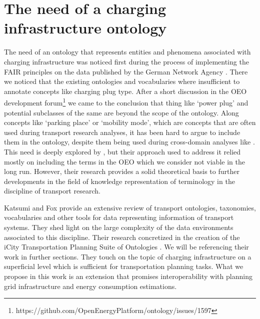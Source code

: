 ﻿\section{The need of a charging infrastructure ontology}
\label{statementofneed}
The need of an ontology that represents entities and phenomena associated with
charging infrastructure was noticed first during the process of implementing
the FAIR principles on the data published by the German Network Agency
\cite{ArellanoRuiz.2024}. There we noticed that the existing ontologies and
vocabularies where insufficient to annotate concepts like charging plug type.
After a short discussion in the OEO development
forum\footnote{https://github.com/OpenEnergyPlatform/ontology/issues/1597} we
came to the conclusion that thing like `power plug' and potential subclasses of
the same are beyond the scope of the ontology. Along concepts like `parking
place' or `mobility mode', which are concepts that are often used during
transport research analyses, it has been hard to argue to include them in the
ontology, despite them being used during cross-domain analyses like
\cite{Hecht.2022}. This need is deeply explored by \cite{Mittermeier.2023}, but
their approach used to address it relied mostly on including the terms in the
OEO which we consider not viable in the long run. However, their research
provides a solid theoretical basis to further developments in the field of
knowledge representation of terminology in the discipline of transport
research.

Katsumi and Fox \cite{Katsumi.2018} provide an extensive review of transport
ontologies, taxonomies, vocabularies and other tools for data representing
information of transport systems. They shed light on the large complexity of
the data environments associated to this discipline. Their research concretized
in the creation of the iCity Transportation Planning Suite of Ontologies
\cite{Katsumi.2019}. We will be referencing their work in further sections.
They touch on the topic of charging infrastructure on a superficial level which
is sufficient for transportation planning tasks. What we propose in this work
is an extension that promises interoperability with planning grid
infrastructure and energy consumption estimations.